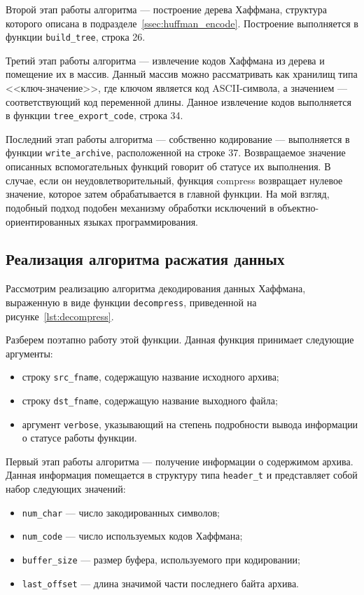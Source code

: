 Второй этап работы алгоритма --- построение дерева Хаффмана, структура которого
описана в подразделе~\ref{ssec:huffman_encode}.
Построение выполняется в функции \texttt{build\_tree}, строка 26.

Третий этап работы алгоритма --- извлечение кодов Хаффмана из дерева и
помещение их в массив. Данный массив можно рассматривать как хранилищ типа
<<ключ-значение>>, где ключом является код ASCII-символа, 
а значением --- соответствующий код переменной длины.
Данное извлечение кодов выполняется в функции \texttt{tree\_export\_code}, 
строка 34.

Последний этап работы алгоритма --- собственно кодирование --- выполняется
в функции \texttt{write\_archive}, расположенной на строке 37.
Возвращаемое значение описанных вспомогательных функций говорит об статусе
их выполнения.
В случае, если он неудовлетворительный, функция compress возвращает нулевое
значение, которое затем обрабатывается в главной функции.
На мой взгляд, подобный подход подобен механизму
обработки исключений в объектно-ориентированных языках программирования.

\subsection{Реализация алгоритма расжатия данных}

Рассмотрим реализацию алгоритма декодирования данных Хаффмана,
выраженную в виде функции \texttt{decompress},
приведенной на рисунке~\ref{lst:decompress}.

Разберем поэтапно работу этой функции. 
Данная функция принимает следующие аргументы:
\begin{itemize}
\item строку \texttt{src\_fname}, содержащую название исходного архива;
\item строку \texttt{dst\_fname}, содержащую название выходного файла;
\item аргумент \texttt{verbose}, указывающий на степень подробности вывода
  информации о статусе работы функции.
\end{itemize}

Первый этап работы алгоритма --- получение информации о содержимом архива.
Данная информация помещается в структуру типа \texttt{header\_t} и 
представляет собой набор следующих значений:
\begin{itemize}
  \item \texttt{num\_char} --- число закодированных символов;
  \item \texttt{num\_code} --- число используемых кодов Хаффмана;
  \item \texttt{buffer\_size} --- размер буфера, используемого при кодировании;
  \item \texttt{last\_offset} --- длина значимой части последнего байта архива.
\end{itemize}

